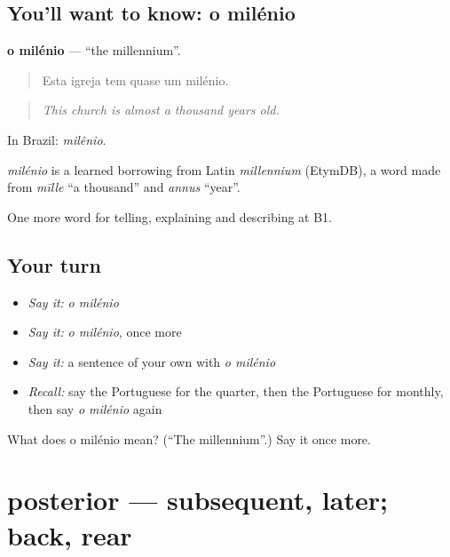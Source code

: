 \subsection*{You'll want to know: o milénio}
\textbf{o milénio} — \textquotedblleft{}the millennium\textquotedblright{}.

\begin{quote}
Esta igreja tem quase um milénio.
\end{quote}

\begin{quote}
\emph{This church is almost a thousand years old.}
\end{quote}

In Brazil: \emph{milênio}.

\begin{cousinweb}
\emph{milénio} is a learned borrowing from Latin \emph{millennium} (EtymDB), a word made from \emph{mīlle} \textquotedblleft{}a thousand\textquotedblright{} and \emph{annus} \textquotedblleft{}year\textquotedblright{}.
\end{cousinweb}

\begin{grammarlens}[title={What you've built}]
One more word for telling, explaining and describing at B1.
\end{grammarlens}

\subsection*{Your turn}
\begin{itemize}
\raggedright
  \item \emph{Say it:} \emph{o milénio}
  \item \emph{Say it:} \emph{o milénio}, once more
  \item \emph{Say it:} a sentence of your own with \emph{o milénio}
  \item \emph{Recall:} say the Portuguese for the quarter, then the Portuguese for monthly, then say \emph{o milénio} again
\end{itemize}

\begin{tcolorbox}[breakable,colback=teal!4,colframe=teal!35!black,title={Before you move on}]
What does o milénio mean? (\textquotedblleft{}The millennium\textquotedblright{}.) Say it once more.
\end{tcolorbox}
\section[posterior]{posterior — subsequent, later; back, rear}

